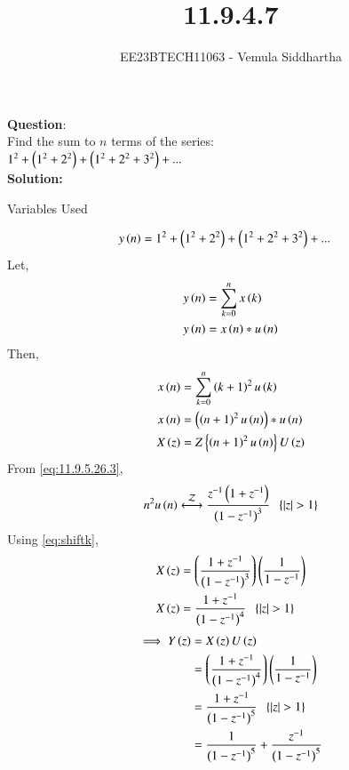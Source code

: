 \documentclass[journal,12pt,twocolumn]{IEEEtran}
\theoremstyle{remark}
\begin{document}

\vspace{3cm}

\title{11.9.4.7}
\author{EE23BTECH11063 - Vemula Siddhartha
}
\maketitle
\newpage
\bigskip

\renewcommand{\thefigure}{\theenumi}
\renewcommand{\thetable}{\theenumi}
\textbf{Question}:\\
Find the sum to $n$ terms of the series:\\
    $1^2+\left(1^2+2^2\right)+\left(1^2+2^2+3^2\right)+...$
    \\
\textbf{Solution:}
\begin{table}[h!]    
    \centering
    
    \caption{Variables Used}
    \label{tab10.5.3.9.1}
  \end{table}
\begin{align}
    y\left(n\right)&=1^2+\left(1^2+2^2\right)+\left(1^2+2^2+3^2\right)+...
\end{align}
Let,
\begin{align}
    y\left(n\right)&=\sum_{k=0}^{n}x\left(k\right)\\
    y\left(n\right)&=x\left(n\right)*u\left(n\right)
\end{align}
Then,
\begin{align}
    x\left(n\right)&=\sum_{k=0}^{n}\left(k+1\right)^2u\left(k\right)\\
    x\left(n\right)&=\left(\left(n+1\right)^2u\left(n\right)\right)*u\left(n\right)\\
    X\left(z\right)&=Z\left\{\left(n+1\right)^2u\left(n\right)\right\}U\left(z\right)
\end{align}
From \eqref{eq:11.9.5.26.3},
\begin{align}
    n^2u\brak{n}\system{Z}\frac{z^{-1}\brak{1+z^{-1}}}{\brak{1-z^{-1}}^3}\;\;\cbrak{\abs{z}>1}
\end{align}
Using \eqref{eq:shiftk},
\begin{align}
    X\left(z\right)&=\left(\frac{1+z^{-1}}{\left(1-z^{-1}\right)^3}\right)\left(\frac{1}{1-z^{-1}}\right)\\
    X\left(z\right)&=\frac{1+z^{-1}}{\left(1-z^{-1}\right)^4}\;\;\left\{\left\vert z\right\vert>1\right\}
\end{align}
\begin{align}
    \implies Y\left(z\right)&=X\left(z\right)U\left(z\right)\\
    &=\left(\frac{1+z^{-1}}{\left(1-z^{-1}\right)^4}\right)\left(\frac{1}{1-z^{-1}}\right)\\
    &=\frac{1+z^{-1}}{\left(1-z^{-1}\right)^5}\;\;\left\{\left\vert z\right\vert>1\right\}\\
    &=\frac{1}{\left(1-z^{-1}\right)^5}+\frac{z^{-1}}{\left(1-z^{-1}\right)^5}
\end{align}
\end{document}
